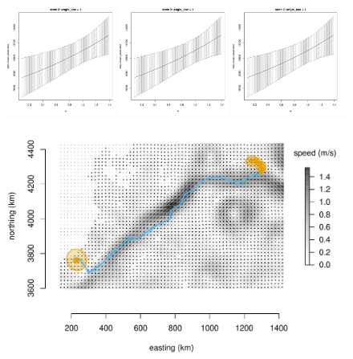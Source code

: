 \documentclass[12pt]{article}
\begin{document}
\begin{figure}[htbp]
  \centering
  \includegraphics[width=0.32\textwidth,page=1]{plot_turtleResults1}
  \includegraphics[width=0.32\textwidth,page=2]{plot_turtleResults1}
  \includegraphics[width=0.32\textwidth,page=4]{plot_turtleResults1}
    \includegraphics[width=\textwidth,page=1]{plot_turtleResults2}

\end{figure}
\end{document}
